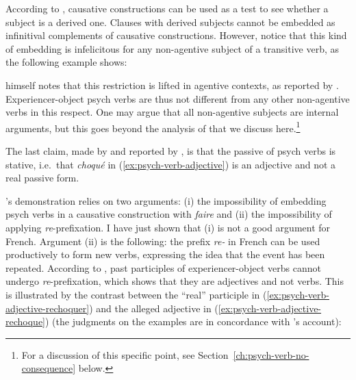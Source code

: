 According to \citet{Burzio.1986}, causative constructions can be used as a test to see whether a subject is a derived one. Clauses with derived subjects cannot be embedded as infinitival complements of causative constructions. However, notice that this kind of embedding is infelicitous for any non-agentive subject of a transitive verb, as the following example shows:

\eal 
{}
\zl 

\citeauthor{Kayne.1975} himself notes that this restriction is lifted in agentive contexts, as reported by \citet[38]{Landau.2010}. Experiencer-object psych verbs are thus not different from any other non-agentive verbs in this respect. One may argue that all non-agentive subjects are internal arguments, but this goes beyond the analysis of \citet{Landau.2010} that we discuss here.\footnote{For a discussion of this specific point, see Section~\ref{ch:psych-verb-no-consequence} below.}

The last claim, made by \citeauthor{Legendre.1989} and reported by \citeauthor{Landau.2010}, is that the passive of psych verbs is stative, i.e.\ that \emph{choqué} in (\ref{ex:psych-verb-adjective}) is an adjective and not a real passive form.

\z 

\citeauthor{Legendre.1989}'s demonstration relies on two arguments: (i) the impossibility of embedding psych verbs in a causative construction with \emph{faire} and (ii) the impossibility of applying \emph{re}-prefixation. I have just shown that (i) is not a good argument for French. Argument (ii) is the following: the prefix \emph{re-} in French can be used productively to form new verbs, expressing the idea that the event has been repeated. According to \citeauthor{Legendre.1989}, past participles of experiencer-object verbs cannot undergo \emph{re}-prefixation, which shows that they are adjectives and not verbs. This is illustrated by the contrast between the
``real'' participle in (\ref{ex:psych-verb-adjective-rechoquer}) and the alleged adjective in  (\ref{ex:psych-verb-adjective-rechoque}) (the judgments on the examples are in concordance with \citeauthor{Legendre.1989}'s account):


